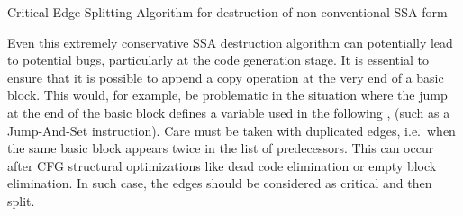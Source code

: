 \begin{algorithm}
\caption{\label{alg:ssadestruction:splitting}Critical Edge Splitting Algorithm for destruction of non-conventional SSA form}
\end{algorithm}


Even this extremely conservative SSA destruction algorithm
can potentially lead to potential bugs,
particularly at the code generation stage.
It is essential to ensure that it is possible
to append a copy operation at the very end of a basic block.
This would, for example, be problematic in the situation 
where the jump at the end of the basic block
defines a variable used in the following \phiop,
(such as a Jump-And-Set instruction).
Care must be taken with duplicated edges, i.e.\
when the same basic block appears twice in the list of predecessors.
This can occur after CFG structural optimizations like
dead code elimination or empty block elimination.
In such case, the edges should be considered as critical and then split.

